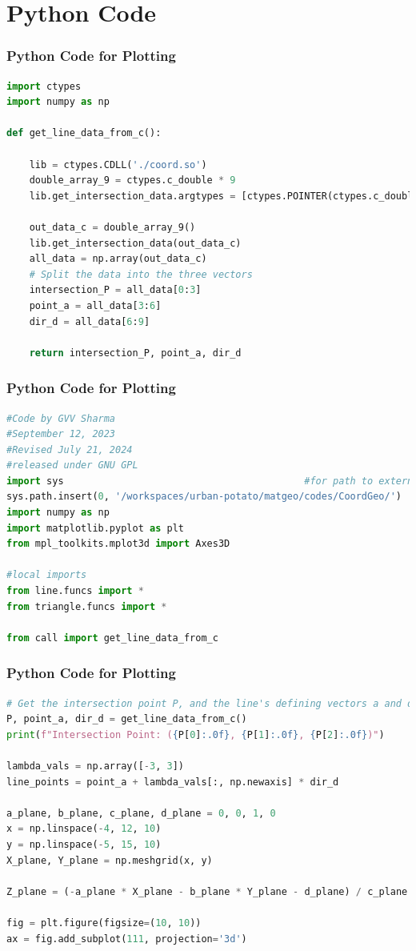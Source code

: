 \documentclass{beamer}
\theoremstyle{remark}
\numberwithin{equation}{section}
\begin{document}
\section{Python Code}
\begin{frame}[fragile]
\frametitle{Python Code for Plotting}
\begin{lstlisting}[language=Python]
import ctypes
import numpy as np

def get_line_data_from_c():

    lib = ctypes.CDLL('./coord.so')
    double_array_9 = ctypes.c_double * 9
    lib.get_intersection_data.argtypes = [ctypes.POINTER(ctypes.c_double)]

    out_data_c = double_array_9()
    lib.get_intersection_data(out_data_c)
    all_data = np.array(out_data_c)
    # Split the data into the three vectors
    intersection_P = all_data[0:3]
    point_a = all_data[3:6]
    dir_d = all_data[6:9]
    
    return intersection_P, point_a, dir_d
\end{lstlisting}
\end{frame}
\begin{frame}[fragile]
\frametitle{Python Code for Plotting}
\begin{lstlisting}[language=Python]
#Code by GVV Sharma
#September 12, 2023
#Revised July 21, 2024
#released under GNU GPL
import sys                                          #for path to external scripts
sys.path.insert(0, '/workspaces/urban-potato/matgeo/codes/CoordGeo/') 
import numpy as np
import matplotlib.pyplot as plt
from mpl_toolkits.mplot3d import Axes3D

#local imports
from line.funcs import *
from triangle.funcs import *

from call import get_line_data_from_c
\end{lstlisting}
\end{frame}

\begin{frame}[fragile]
\frametitle{Python Code for Plotting}
\begin{lstlisting}[language=Python]
# Get the intersection point P, and the line's defining vectors a and d
P, point_a, dir_d = get_line_data_from_c()
print(f"Intersection Point: ({P[0]:.0f}, {P[1]:.0f}, {P[2]:.0f})")

lambda_vals = np.array([-3, 3])
line_points = point_a + lambda_vals[:, np.newaxis] * dir_d
 
a_plane, b_plane, c_plane, d_plane = 0, 0, 1, 0
x = np.linspace(-4, 12, 10)   
y = np.linspace(-5, 15, 10)   
X_plane, Y_plane = np.meshgrid(x, y)
 
Z_plane = (-a_plane * X_plane - b_plane * Y_plane - d_plane) / c_plane

fig = plt.figure(figsize=(10, 10))
ax = fig.add_subplot(111, projection='3d')

\end{lstlisting}
\end{frame}
\end{document}

